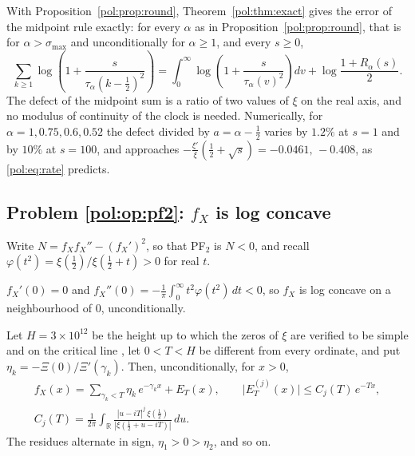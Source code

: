 With Proposition~\ref{pol:prop:round}, Theorem~\ref{pol:thm:exact} gives the error of the midpoint rule exactly: for every $\alpha$ as in Proposition~\ref{pol:prop:round}, that is for $\alpha>\sigma_{\max}$ and unconditionally for $\alpha\ge1$, and every $s\ge0$,
\begin{equation}\label{pol:eq:midpoint}
\sum_{k\ge1}\log\!\left(1+\frac{s}{\tau_\alpha(k-\frac12)^2}\right)=\int_0^\infty\log\!\left(1+\frac{s}{\tau_\alpha(v)^2}\right)dv+\log\frac{1+R_\alpha(s)}{2}.
\end{equation}
The defect of the midpoint sum is a ratio of two values of $\xi$ on the real axis, and no modulus of continuity of the clock is needed. Numerically, for $\alpha=1,0.75,0.6,0.52$ the defect divided by $a=\alpha-\frac12$ varies by $1.2\%$ at $s=1$ and by $10\%$ at $s=100$, and approaches $-\frac{\xi'}{\xi}(\frac12+\sqrt s)=-0.0461,\,-0.408$, as \eqref{pol:eq:rate} predicts.

\subsection{Problem \ref{pol:op:pf2}: $f_X$ is log concave}

Write $N=f_Xf_X''-(f_X')^2$, so that PF$_2$ is $N<0$, and recall $\varphi(t^2)=\xi(\frac12)/\xi(\frac12+t)>0$ for real $t$.

\begin{lemma}[Origin]\label{pol:lem:origin}
$f_X'(0)=0$ and $f_X''(0)=-\frac1\pi\int_0^\infty t^2\varphi(t^2)\,dt<0$, so $f_X$ is log concave on a neighbourhood of $0$, unconditionally.
\end{lemma}

\begin{lemma}\label{pol:lem:residue}
Let $H=3\times10^{12}$ be the height up to which the zeros of $\xi$ are verified to be simple and on the critical line \cite{PT21}, let $0<T<H$ be different from every ordinate, and put $\eta_k=-\Xi(0)/\Xi'(\gamma_k)$. Then, unconditionally, for $x>0$,
\begin{equation}\label{pol:eq:residue}
\begin{gathered}
f_X(x)=\sum_{\gamma_k<T}\eta_k\,e^{-\gamma_kx}+E_T(x),\qquad \big|E_T^{(j)}(x)\big|\le C_j(T)\,e^{-Tx},\\[4pt]
C_j(T)=\frac{1}{2\pi}\int_{\mathbb R}\frac{|u-iT|^j\,\xi(\frac12)}{|\xi(\frac12+u-iT)|}\,du .
\end{gathered}
\end{equation}
The residues alternate in sign, $\eta_1>0>\eta_2$, and so on.
\end{lemma}

